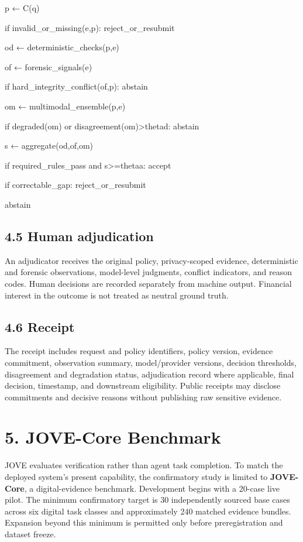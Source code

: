\documentclass[11pt]{article}
\begin{document}
p ← C(q)\par
if invalid\_or\_missing(e,p): reject\_or\_resubmit\par
od ← deterministic\_checks(p,e)\par
of ← forensic\_signals(e)\par
if hard\_integrity\_conflict(of,p): abstain\par
om ← multimodal\_ensemble(p,e)\par
if degraded(om) or disagreement(om)>thetad: abstain\par
s ← aggregate(od,of,om)\par
if required\_rules\_pass and s>=thetaa: accept\par
if correctable\_gap: reject\_or\_resubmit\par
abstain\par

\subsection{4.5 Human adjudication}

An adjudicator receives the original policy, privacy-scoped evidence, deterministic and forensic observations, model-level judgments, conflict indicators, and reason codes. Human decisions are recorded separately from machine output. Financial interest in the outcome is not treated as neutral ground truth.\par

\subsection{4.6 Receipt}

The receipt includes request and policy identifiers, policy version, evidence commitment, observation summary, model/provider versions, decision thresholds, disagreement and degradation status, adjudication record where applicable, final decision, timestamp, and downstream eligibility. Public receipts may disclose commitments and decisive reasons without publishing raw sensitive evidence.\par

\section{5. JOVE-Core Benchmark}

JOVE evaluates verification rather than agent task completion. To match the deployed system's present capability, the confirmatory study is limited to \textbf{JOVE-Core}, a digital-evidence benchmark. Development begins with a 20-case live pilot. The minimum confirmatory target is 30 independently sourced base cases across six digital task classes and approximately 240 matched evidence bundles. Expansion beyond this minimum is permitted only before preregistration and dataset freeze.\par
\end{document}
